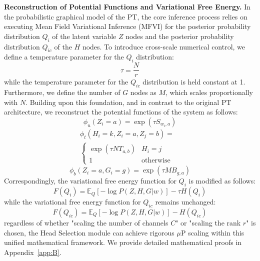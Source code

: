\documentclass[11pt]{article}
\begin{document}
\noindent
\textbf{Reconstruction of Potential Functions and Variational Free Energy.} In the probabilistic graphical model of the PT, the core inference process relies on executing Mean Field Variational Inference (MFVI) for the posterior probability distribution $Q_i$ of the latent variable $Z$ nodes and the posterior probability distribution $Q_{ic}$ of the $H$ nodes. To introduce cross-scale numerical control, we define a temperature parameter for the $Q_i$ distribution:
\begin{equation}
\tau=\frac{N}{r}
\end{equation}
while the temperature parameter for the $Q_{ic}$ distribution is held constant at 1. Furthermore, we define the number of $G$ nodes as $M$, which scales proportionally with $N$. Building upon this foundation, and in contrast to the original PT architecture, we reconstruct the potential functions of the system as follows:
\begin{equation}
\phi_u(Z_i=a)=\exp(\tau S_{w_i,a}) 
\end{equation}
\begin{equation}
\begin{split}
\phi_t(H_i=k,Z_i=a,Z_j=b) = & \\
\begin{cases} 
    \exp(\tau N T_{a,b}) & H_i=j \\ 
    1 & \text{otherwise} 
\end{cases} &
\end{split}
\end{equation}
\begin{equation}
\phi_b(Z_i=a,G_i=g)=\exp(\tau M B_{g,a})
\end{equation}
Correspondingly, the variational free energy function for $Q_i$ is modified as follows:
\begin{equation}
F(Q_i)=\mathbb{E}_Q[-\log P(Z,H,G|w)]-\tau H(Q_i)
\end{equation}
while the variational free energy function for $Q_{ic}$ remains unchanged:
\begin{equation}
F(Q_{ic})=\mathbb{E}_Q[-\log P(Z,H,G|w)]-H(Q_{ic})
\end{equation}
regardless of whether "scaling the number of channels $C$" or "scaling the rank $r$" is chosen, the Head Selection module can achieve rigorous $\mu$P scaling within this unified mathematical framework. We provide detailed mathematical proofs in Appendix~\ref{app:B}.\\
\end{document}

